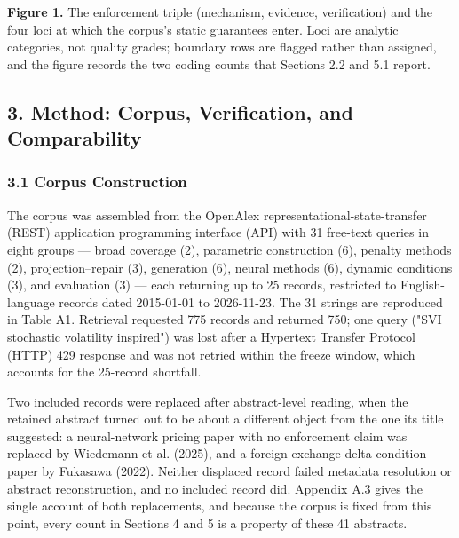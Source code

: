 \documentclass[11pt]{article}
\begin{document}
\textbf{Figure 1.} The enforcement triple (mechanism, evidence, verification) and the four loci at which the corpus's static guarantees enter. Loci are analytic categories, not quality grades; boundary rows are flagged rather than assigned, and the figure records the two coding counts that Sections 2.2 and 5.1 report.

\subsection*{3. Method: Corpus, Verification, and Comparability}
\subsubsection*{3.1 Corpus Construction}
The corpus was assembled from the OpenAlex representational-state-transfer (REST) application programming interface (API) with 31 free-text queries in eight groups — broad coverage (2), parametric construction (6), penalty methods (2), projection–repair (3), generation (6), neural methods (6), dynamic conditions (3), and evaluation (3) — each returning up to 25 records, restricted to English-language records dated 2015-01-01 to 2026-11-23. The 31 strings are reproduced in Table A1. Retrieval requested 775 records and returned 750; one query ("SVI stochastic volatility inspired") was lost after a Hypertext Transfer Protocol (HTTP) 429 response and was not retried within the freeze window, which accounts for the 25-record shortfall.

Two included records were replaced after abstract-level reading, when the retained abstract turned out to be about a different object from the one its title suggested: a neural-network pricing paper with no enforcement claim was replaced by Wiedemann et al. (2025), and a foreign-exchange delta-condition paper by Fukasawa (2022). Neither displaced record failed metadata resolution or abstract reconstruction, and no included record did. Appendix A.3 gives the single account of both replacements, and because the corpus is fixed from this point, every count in Sections 4 and 5 is a property of these 41 abstracts.
\end{document}
